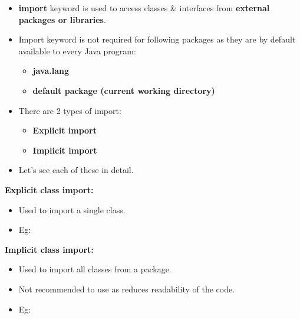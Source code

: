\setlength{\columnsep}{3pt}
\begin{flushleft}
	
	\begin{itemize}
		\item \textbf{import} keyword is used to access classes \& interfaces from \textbf{external packages or libraries}. 
		\item Import keyword is not required for following packages as they are by default available to every Java program:
		\begin{itemize}
			\item \textbf{java.lang}
			\item \textbf{default package (current working directory)}
		\end{itemize} 
		\item There are 2 types of import:
		\begin{itemize}
			\item \textbf{Explicit import}
			\item \textbf{Implicit import}
		\end{itemize}	
		\item Let's see each of these in detail.
	\end{itemize}		

	\newpage
	\textbf{Explicit class import:} 
	\begin{itemize}
		\item Used to import a single class.
			\bigskip
			\item Eg:
		\end{itemize}
		
		\textbf{Implicit class import:} 
		\begin{itemize}
			\item Used to import all classes from a package.
			\item Not recommended to use as reduces readability of the code.
			\bigskip
			\item Eg:
		

\end{itemize}
\end{flushleft}
